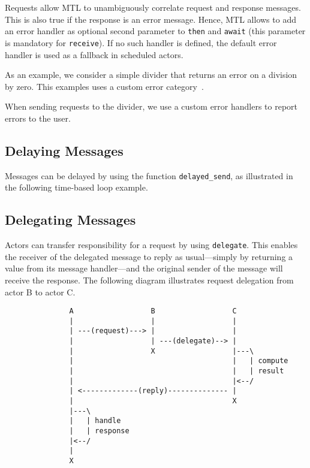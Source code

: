 Requests allow MTL to unambiguously correlate request and response messages.
This is also true if the response is an error message. Hence, MTL allows to
add an error handler as optional second parameter to \lstinline^then^ and
\lstinline^await^ (this parameter is mandatory for \lstinline^receive^). If no
such handler is defined, the default error handler  is used
as a fallback in scheduled actors.

As an example, we consider a simple divider that returns an error on a division
by zero. This examples uses a custom error category~.


When sending requests to the divider, we use a custom error handlers to report
errors to the user.


\clearpage
\subsection{Delaying Messages}
\label{delay-message}

Messages can be delayed by using the function \lstinline^delayed_send^, as
illustrated in the following time-based loop example.


\clearpage
\subsection{Delegating Messages}
\label{delegate}

Actors can transfer responsibility for a request by using \lstinline^delegate^.
This enables the receiver of the delegated message to reply as usual---simply
by returning a value from its message handler---and the original sender of the
message will receive the response. The following diagram illustrates request
delegation from actor B to actor C.

\begin{footnotesize}
\begin{verbatim}
               A                  B                  C
               |                  |                  |
               | ---(request)---> |                  |
               |                  | ---(delegate)--> |
               |                  X                  |---\
               |                                     |   | compute
               |                                     |   | result
               |                                     |<--/
               | <-------------(reply)-------------- |
               |                                     X
               |---\
               |   | handle
               |   | response
               |<--/
               |
               X
\end{verbatim}
\end{footnotesize}

